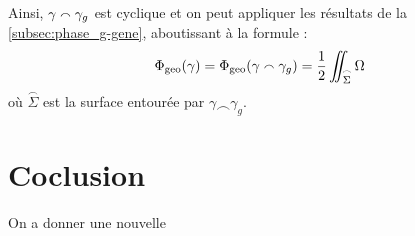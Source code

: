 Ainsi, $\gamma \smallfrown \gamma_g$ est cyclique et on peut appliquer les résultats de la \cref{subsec:phase_g-gene}, aboutissant à la formule :
\begin{equation} \label{eq:phase_g-general}
	\Phi_{\text{\normalfont geo}}(\gamma) = \Phi_{\text{\normalfont geo}}(\gamma  \smallfrown \gamma_g) = \frac{1}{2} \iint_{\overset{\frown}{\Sigma}} \Omega
\end{equation}
où $\overset{\frown}{\Sigma}$ est la surface entourée par $\gamma \smallfrown \gamma_g$.
\\





\section{Coclusion}

On a donner une nouvelle 

